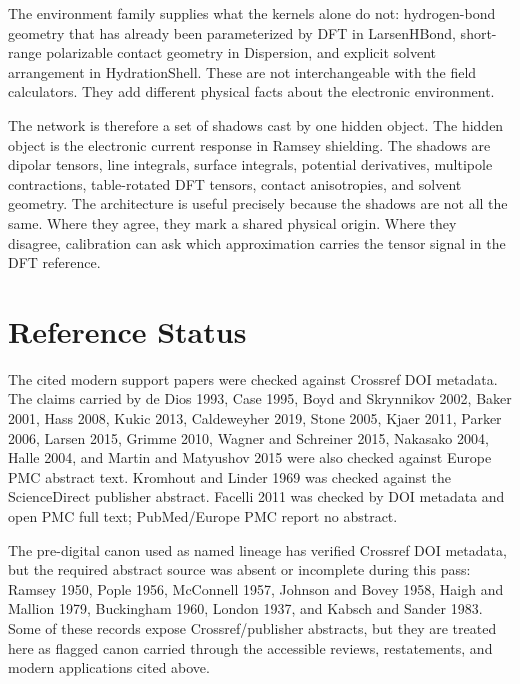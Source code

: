 \documentclass[11pt]{article}
\begin{document}
The environment family supplies what the kernels alone do not: hydrogen-bond
geometry that has already been parameterized by DFT in LarsenHBond, short-range
polarizable contact geometry in Dispersion, and explicit solvent arrangement in
HydrationShell. These are not interchangeable with the field calculators. They
add different physical facts about the electronic environment.

The network is therefore a set of shadows cast by one hidden object. The hidden
object is the electronic current response in Ramsey shielding. The shadows are
dipolar tensors, line integrals, surface integrals, potential derivatives,
multipole contractions, table-rotated DFT tensors, contact anisotropies, and
solvent geometry. The architecture is useful precisely because the shadows are
not all the same. Where they agree, they mark a shared physical origin. Where
they disagree, calibration can ask which approximation carries the tensor signal
in the DFT reference.

\section{Reference Status}

The cited modern support papers were checked against Crossref DOI metadata. The
claims carried by de Dios 1993, Case 1995, Boyd and Skrynnikov 2002, Baker
2001, Hass 2008, Kukic 2013, Caldeweyher 2019, Stone 2005, Kjaer 2011, Parker
2006, Larsen 2015, Grimme 2010, Wagner and Schreiner 2015, Nakasako 2004,
Halle 2004, and Martin and Matyushov 2015 were also checked against Europe PMC
abstract text. Kromhout and Linder 1969 was checked against the ScienceDirect
publisher abstract. Facelli 2011 was checked by DOI metadata and open PMC full
text; PubMed/Europe PMC report no abstract.

The pre-digital canon used as named lineage has verified Crossref DOI metadata,
but the required abstract source was absent or incomplete during this pass:
Ramsey 1950, Pople 1956, McConnell 1957, Johnson and Bovey 1958, Haigh and
Mallion 1979, Buckingham 1960, London 1937, and Kabsch and Sander 1983. Some of
these records expose Crossref/publisher abstracts, but they are treated here as
flagged canon carried through the accessible reviews, restatements, and modern
applications cited above.
\end{document}
